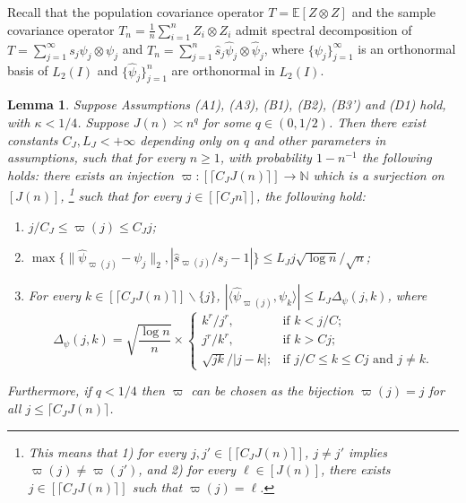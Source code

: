 \documentclass[11pt,a4paper]{article}
\renewcommand{\hat}{\widehat}
\theoremstyle{definition}
\theoremstyle{plain}
\newtheorem{lemma}{Lemma}[section]
\theoremstyle{remark}
\begin{document}
Recall that the population covariance operator $T=\mathbb E[Z\otimes Z]$ and the sample covariance operator $T_n=\frac{1}{n}\sum_{i=1}^nZ_i\otimes Z_i$ admit spectral decomposition of
$T=\sum_{j=1}^{\infty}s_j\psi_j\otimes\psi_j$ and $T_n=\sum_{j=1}^n\hat s_j\hat\psi_j\otimes\hat\psi_j$, where $\{\psi_j\}_{j=1}^{\infty}$ is an orthonormal basis of $L_2(I)$ and $\{\hat\psi_j\}_{j=1}^n$ are orthonormal in $L_2(I)$.
\begin{lemma}
Suppose Assumptions (A1), (A3), (B1), (B2), (B3') and (D1) hold, with $\kappa<1/4$.
Suppose $J(n) \asymp n^{q}$ for some $q\in(0,1/2)$. 
Then there exist constants $C_J,L_J<+\infty$ depending only on $q$ and other parameters in assumptions, such that for every $n\geq 1$, 
with probability $1-n^{-1}$ the following holds: there exists an injection $\varpi:[\lceil C_J J(n)\rceil]\to \mathbb N$ which is a surjection on $[J(n)]$,
\footnote{This means that 1) for every $j,j'\in[\lceil C_JJ(n)\rceil]$, $j\neq j'$ implies $\varpi(j)\neq\varpi(j')$, and 2) for every $\ell\in[J(n)]$, there exists $j\in[\lceil C_JJ(n)\rceil]$ such that $\varpi(j)=\ell$.}
 such that for every $j\in[\lceil C_J n\rceil]$, the following hold:
\begin{enumerate}
\item $j/C_J\leq \varpi(j)\leq C_J j$;
\item $\max\{\|\hat\psi_{\varpi(j)}-\psi_j\|_2, |\hat s_{\varpi(j)}/s_j-1|\}\leq L_J j\sqrt{\log n}/\sqrt{n}$;
\item For every $k\in[\lceil C_J J(n)\rceil]\backslash\{j\}$, $|\langle\hat\psi_{\varpi(j)},\psi_k\rangle|\leq L_J\Delta_\psi(j,k)$, where
$$
\Delta_\psi(j,k) = \sqrt{\frac{\log n}{n}}\times \left\{\begin{array}{ll} k^r/j^r,& \text{if }k< j/C;\\ j^r/k^r,& \text{if } k> Cj;\\ \sqrt{jk}/|j-k|;& \text{if $j/C \leq k \leq Cj$ and $j\neq k$.}\end{array}\right.
$$
\end{enumerate}
Furthermore, if $q<1/4$ then $\varpi$ can be chosen as the bijection $\varpi(j)=j$ for all $j\leq \lceil C_JJ(n)\rceil$.
\label{lem:stability}
\end{lemma}

\end{document}
